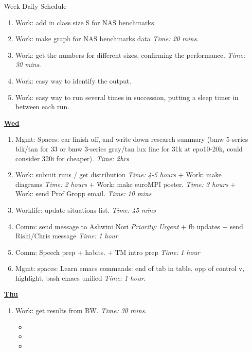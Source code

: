 \documentclass[serif, mathserif, final]{beamer}
\newcommand{\timeEst}[1]{\textit{Time:} \textit{#1}}
\newcommand{\priority}[1]{\textit{Priority:} \textit{#1}}
\begin{document}
\begin{frame}{}
\begin{columns}
\begin{column}{0.50\linewidth}
\begin{block}{Week Daily Schedule}
\begin{enumerate}
\item \tiny Work: add in class size S for NAS benchmarks. 
\item \tiny Work: make graph for NAS benchmarks data \timeEst{20 mins}. 

\item \tiny Work: get the numbers for different sizes, confirming the performance. \timeEst{30 mins}.  
\item \tiny Work: easy way to identify the output. 
\item \tiny Work: easy way to run several times in succession, putting a sleep timer in between each run. 
\end{enumerate} 

\textbf{\small {\underline{Wed}}}
\begin{enumerate} 

\tiny \item \tiny Mgmt: Spaces: car finish off, and write down research summary (bmw 5-series blk/tan for 33  or bmw 3-series gray/tan lux line for 31k at cpo10-20k, could consider 320i for cheaper). \timeEst{ 2hrs} 

\item \tiny Work: submit runs / get distribution \timeEst{4-5 hours}  + Work: make diagrams \timeEst{2 hours}   + Work: make euroMPI poster. \timeEst{3 hours} + Work: send Prof Gropp email. \timeEst{10 mins} 

\item \tiny Worklife: update situations list. \timeEst{45 mins}

\tiny \item \tiny Comm: send message to Ashwini Nori \priority{Urgent}  + fb updates + send Rishi/Chris message  \timeEst{1 hour} 
\tiny \item \tiny Comm: Speech prep + habits. + TM intro prep \timeEst{1 hour}

\item \tiny Mgmt: spaces: Learn emacs commands:  end of tab in table, opp of control v, highlight, bash emacs unified  \timeEst{1 hour}. 
\end{enumerate} 

\textbf{\small{\underline{Thu}}}
\begin{enumerate} 

\item \tiny Work: get results from BW. \timeEst{30 mins}. 
\begin{itemize}
\item \tiny 
\item \tiny 
\item \tiny 
\end{itemize} 


\end{enumerate}
\end{block}
\end{column}
\end{columns}
\end{frame}
\end{document}
